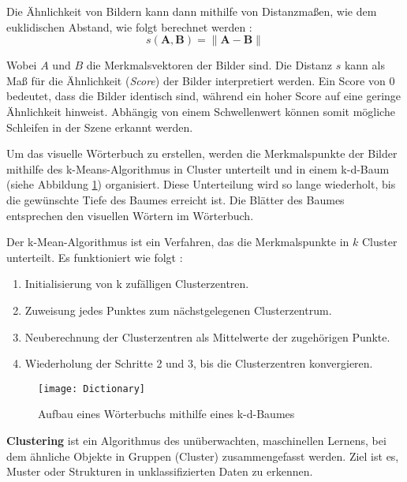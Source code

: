 Die Ähnlichkeit von Bildern kann dann mithilfe von Distanzmaßen, wie dem euklidischen Abstand, wie folgt berechnet werden \cite{gao2021vSLAM}:
\begin{equation}
    s(\mathbf{A}, \mathbf{B}) = \|\mathbf{A} - \mathbf{B}\|
\end{equation}

Wobei \( A \) und \( B \) die Merkmalsvektoren der Bilder sind. Die Distanz \( s \) kann als Maß für die Ähnlichkeit (\emph{Score}) der Bilder interpretiert werden. Ein Score von 0 bedeutet, dass die Bilder identisch sind, während ein hoher Score auf eine geringe Ähnlichkeit hinweist. Abhängig von einem Schwellenwert können somit mögliche Schleifen in der Szene erkannt werden. \cite{gao2021vSLAM}

Um das visuelle Wörterbuch zu erstellen, werden die Merkmalspunkte der Bilder mithilfe des k-Means-Algorithmus in Cluster unterteilt und in einem k-d-Baum (siehe Abbildung \ref{fig:Dictionary}) organisiert. Diese Unterteilung wird so lange wiederholt, bis die gewünschte Tiefe des Baumes erreicht ist. Die Blätter des Baumes entsprechen den visuellen Wörtern im Wörterbuch. \cite{gao2021vSLAM}

Der k-Mean-Algorithmus ist ein Verfahren, das die Merkmalspunkte in \( k \) Cluster unterteilt. Es funktioniert wie folgt \cite{teynor2024ml}:

\begin{enumerate}
    \item Initialisierung von k zufälligen Clusterzentren.
    \item Zuweisung jedes Punktes zum nächstgelegenen Clusterzentrum.
    \item Neuberechnung der Clusterzentren als Mittelwerte der zugehörigen Punkte.
    \item Wiederholung der Schritte 2 und 3, bis die Clusterzentren konvergieren.
\end{enumerate}

\begin{figure}[ht]
    \centering
    \texttt{[image: Dictionary]}
    \caption{Aufbau eines Wörterbuchs mithilfe eines k-d-Baumes \cite{gao2021vSLAM}\label{fig:Dictionary}}\par
\end{figure}

\begin{tcolorbox}[colback=THAi-Blue!20!white, colframe=THAi-Blue]
    \textbf{Clustering} ist ein Algorithmus des unüberwachten, maschinellen Lernens, bei dem ähnliche Objekte in Gruppen (Cluster) zusammengefasst werden. Ziel ist es, Muster oder Strukturen in unklassifizierten Daten zu erkennen. \cite{wikipedia2025clusteranalyse}
\end{tcolorbox}

